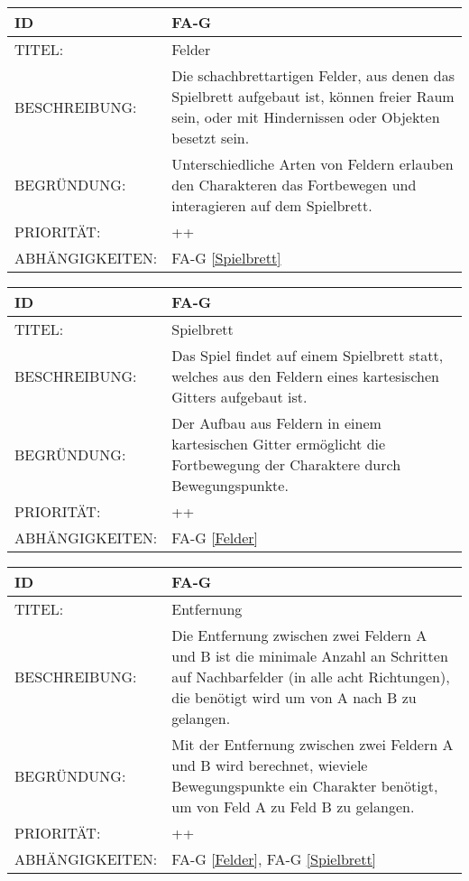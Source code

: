 
\begin{tabularx}{16cm}{l|X}
	{table}\label{Felder}
	\textbf{ID} & \textbf{FA-G \arabic{table}} \\
	\hline
	TITEL: & Felder \\
	\hline
	BESCHREIBUNG: & Die schachbrettartigen Felder, aus denen das Spielbrett aufgebaut ist, können freier Raum sein, oder mit Hindernissen oder Objekten besetzt sein. \\
	\hline
	BEGRÜNDUNG: & Unterschiedliche Arten von Feldern erlauben den Charakteren das Fortbewegen und interagieren auf dem Spielbrett. \\
	\hline
	PRIORITÄT: & ++\\
	\hline
	ABHÄNGIGKEITEN: & FA-G \ref{Spielbrett} \\
\end{tabularx}

\begin{tabularx}{16cm}{l|X}
	{table}\label{Spielbrett}
	\textbf{ID} & \textbf{FA-G \arabic{table}} \\
	\hline
	TITEL: & Spielbrett \\
	\hline
	BESCHREIBUNG: & Das Spiel findet auf einem Spielbrett statt, welches aus den Feldern eines kartesischen Gitters aufgebaut ist. \\
	\hline
	BEGRÜNDUNG: & Der Aufbau aus Feldern in einem kartesischen Gitter ermöglicht die Fortbewegung der Charaktere durch Bewegungspunkte. \\
	\hline
	PRIORITÄT: & ++\\
	\hline
	ABHÄNGIGKEITEN: & FA-G \ref{Felder} \\
\end{tabularx}

\begin{tabularx}{16cm}{l|X}
	{table}\label{Entfernung}
	\textbf{ID} & \textbf{FA-G \arabic{table}} \\
	\hline
	TITEL: & Entfernung \\
	\hline
	BESCHREIBUNG: & Die Entfernung zwischen zwei Feldern A und B ist die minimale Anzahl an Schritten auf Nachbarfelder (in alle acht Richtungen), die benötigt wird um von A nach B zu gelangen. \\
	\hline
	BEGRÜNDUNG: & Mit der Entfernung zwischen zwei Feldern A und B wird berechnet, wieviele Bewegungspunkte ein Charakter benötigt, um von Feld A zu Feld B zu gelangen. \\
	\hline
	PRIORITÄT: & ++\\
	\hline
	ABHÄNGIGKEITEN: & FA-G \ref{Felder}, FA-G \ref{Spielbrett} \\
\end{tabularx}

